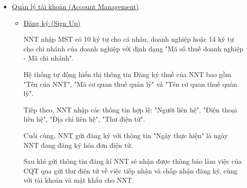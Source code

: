 \begin{itemize}

    \item \underline{Quản lý tài khoản (Account Management)}

          \begin{itemize}

              \item \underline{Đăng ký (Sign Up)}

                    NNT nhập MST có 10 ký tự cho cá nhân, doanh nghiệp hoặc 14 ký tự cho chi nhánh của doanh nghiệp với định dạng "Mã số thuế doanh nghiệp - Mã chi nhánh".




                    Hệ thống tự động hiển thị thông tin Đăng ký thuế của NNT bao gồm "Tên của NNT", "Mã cơ quan thuế quản lý" và "Tên cơ quan thuế quản lý".

                    Tiếp theo, NNT nhập các thông tin hợp lệ: "Người liên hệ", "Điện thoại liên hệ", "Địa chỉ liên hệ", "Thư điện tử".

                    Cuối cùng, NNT gửi đăng ký với thông tin "Ngày thực hiện" là ngày NNT đang đăng ký hóa đơn điện tử.

                    Sau khi gửi thông tin đăng kí NNT sẽ nhận được thông báo làm việc của CQT qua gửi thư điện tử về việc tiếp nhận và chấp nhận đăng ký, cùng với tài khoản và mật khẩu cho NNT.







\end{itemize}
\end{itemize}
